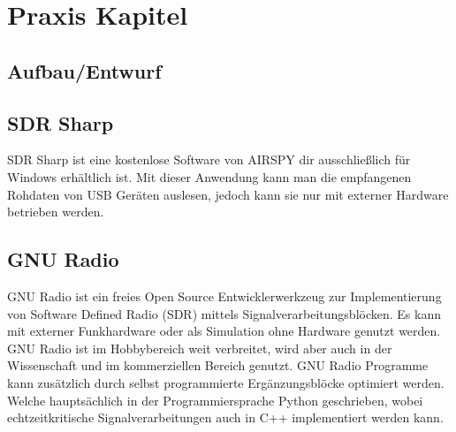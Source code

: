 \chapter{Praxis Kapitel}
\section{Aufbau/Entwurf}
\section{SDR Sharp}
SDR Sharp ist eine kostenlose Software von AIRSPY dir ausschließlich für Windows erhältlich ist. Mit dieser Anwendung kann man die empfangenen Rohdaten von USB Geräten auslesen, jedoch kann sie nur mit externer Hardware betrieben werden.  
\section{GNU Radio}
GNU  Radio  ist  ein  freies  Open  Source  Entwicklerwerkzeug  zur  Implementierung von Software Defined Radio (SDR) mittels Signalverarbeitungsblöcken. Es kann mit externer Funkhardware oder als Simulation ohne Hardware genutzt werden. GNU Radio ist im Hobbybereich weit verbreitet, wird aber auch in der Wissenschaft und im kommerziellen Bereich genutzt. GNU Radio Programme kann zusätzlich  durch selbst programmierte Ergänzungsblöcke optimiert werden. Welche hauptsächlich in der Programmiersprache Python geschrieben, wobei echtzeitkritische Signalverarbeitungen auch in C++ implementiert werden kann.
